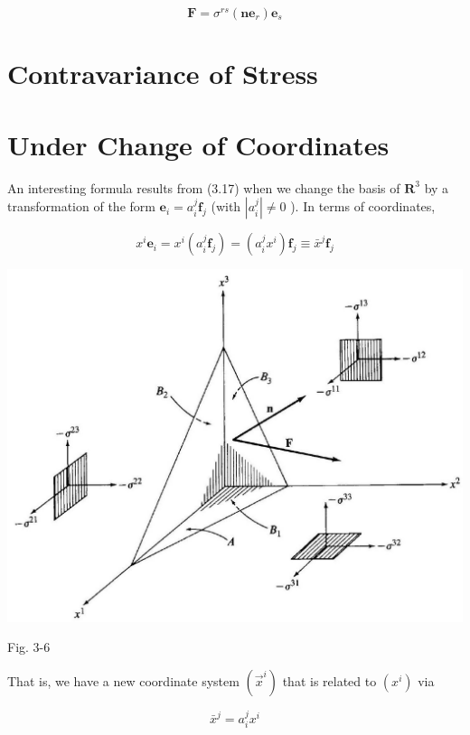 \documentclass[10pt]{article}
\begin{document}
\begin{equation*}
\mathbf{F}=\sigma^{r s}\left(\mathbf{n} \mathbf{e}_{r}\right) \mathbf{e}_{s} \tag{3.17}
\end{equation*}


\section*{Contravariance of Stress}
\section*{Under Change of Coordinates}
An interesting formula results from (3.17) when we change the basis of $\mathbf{R}^{3}$ by a transformation of the form $\mathbf{e}_{i}=a_{i}^{j} \mathbf{f}_{j}$ (with $\left|a_{i}^{j}\right| \neq 0$ ). In terms of coordinates,

$$
x^{i} \mathbf{e}_{i}=x^{i}\left(a_{i}^{j} \mathbf{f}_{j}\right)=\left(a_{i}^{j} x^{i}\right) \mathbf{f}_{j} \equiv \bar{x}^{j} \mathbf{f}_{j}
$$

\begin{center}
\includegraphics[max width=\textwidth]{2024_04_03_41f90be4f896e21f0dc9g-040}
\end{center}

Fig. 3-6

That is, we have a new coordinate system $\left(\vec{x}^{i}\right)$ that is related to $\left(x^{i}\right)$ via


\begin{equation*}
\bar{x}^{j}=a_{i}^{j} x^{i} \tag{3.18}
\end{equation*}
\end{document}

